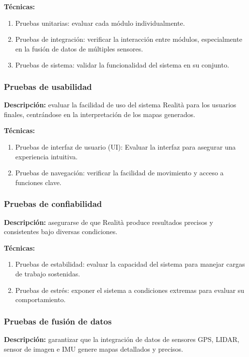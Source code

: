 \documentclass[12pt,a4paper, twoside]{article} %
\begin{document}
\textbf{Técnicas:}
\begin{enumerate}
    \item Pruebas unitarias: evaluar cada módulo individualmente.
    \item Pruebas de integración: verificar la interacción entre módulos, especialmente en la fusión de datos de múltiples sensores.
    \item Pruebas de sistema: validar la funcionalidad del sistema en su conjunto.
\end{enumerate}

\subsubsection{Pruebas de usabilidad}

\textbf{Descripción:} evaluar la facilidad de uso del sistema Realità para los usuarios finales, centrándose en la interpretación de los mapas generados.

\textbf{Técnicas:}
\begin{enumerate}
    \item Pruebas de interfaz de usuario (UI): Evaluar la interfaz para asegurar una experiencia intuitiva.
    \item Pruebas de navegación: verificar la facilidad de movimiento y acceso a funciones clave.
\end{enumerate}

\subsubsection{Pruebas de confiabilidad}

\textbf{Descripción:} asegurarse de que Realità produce resultados precisos y consistentes bajo diversas condiciones.

\textbf{Técnicas:}
\begin{enumerate}
    \item Pruebas de estabilidad: evaluar la capacidad del sistema para manejar cargas de trabajo sostenidas.
    \item Pruebas de estrés: exponer el sistema a condiciones extremas para evaluar su comportamiento.
\end{enumerate}

\subsubsection{Pruebas de fusión de datos}

\textbf{Descripción:} garantizar que la integración de datos de sensores GPS, LIDAR, sensor de imagen e IMU genere mapas detallados y precisos.
\end{document}

